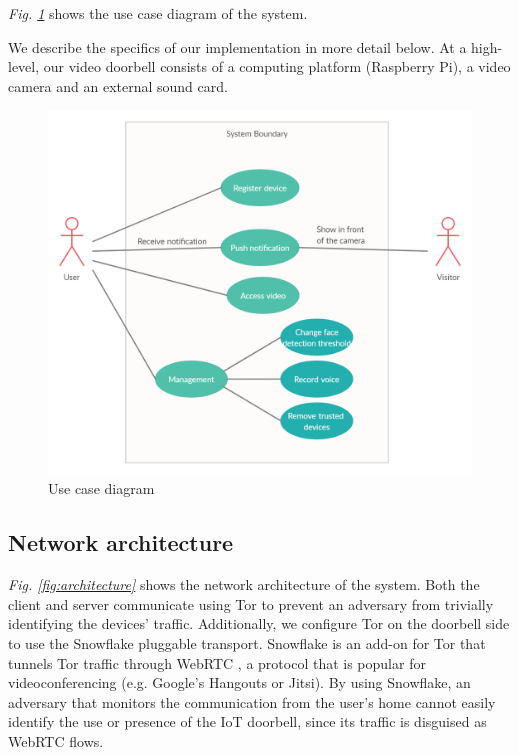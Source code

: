 \textit{Fig. \ref{fig:usecase}} shows the use case diagram of the system.

We describe the specifics of our implementation in more detail below. At a high-level, our video doorbell consists of a computing platform (Raspberry Pi), a video camera and an external sound card.

\begin{figure}
	\includegraphics[width=\linewidth]{Use_case_diagram.png}
	\caption{Use case diagram}
	\label{fig:usecase}
\end{figure}

\subsection{Network architecture}
\label{sec:netarch}
\textit{Fig. \ref{fig:architecture}} shows the network architecture of the system. Both the client and server communicate using Tor to prevent an adversary from trivially identifying the devices' traffic. Additionally, we configure Tor on the doorbell side to use the Snowflake pluggable transport. Snowflake is an add-on for Tor that tunnels Tor traffic through WebRTC \cite{macmillan2020evaluating}, a protocol that is popular for videoconferencing (e.g. Google's Hangouts or Jitsi). By using Snowflake, an adversary that monitors the communication from the user's home cannot easily identify the use or presence of the IoT doorbell, since its traffic is disguised as WebRTC flows.

